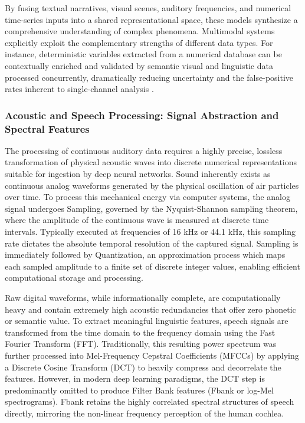 By fusing textual narratives, visual scenes, auditory frequencies, and numerical time-series inputs into a shared representational space, these models synthesize a comprehensive understanding of complex phenomena. Multimodal systems explicitly exploit the complementary strengths of different data types. For instance, deterministic variables extracted from a numerical database can be contextually enriched and validated by semantic visual and linguistic data processed concurrently, dramatically reducing uncertainty and the false-positive rates inherent to single-channel analysis \parencite{gumber2025multimodal}.

\subsubsection{Acoustic and Speech Processing: Signal Abstraction and Spectral Features}
The processing of continuous auditory data requires a highly precise, lossless transformation of physical acoustic waves into discrete numerical representations suitable for ingestion by deep neural networks. Sound inherently exists as continuous analog waveforms generated by the physical oscillation of air particles over time. To process this mechanical energy via computer systems, the analog signal undergoes Sampling, governed by the Nyquist-Shannon sampling theorem, where the amplitude of the continuous wave is measured at discrete time intervals. Typically executed at frequencies of 16 kHz or 44.1 kHz, this sampling rate dictates the absolute temporal resolution of the captured signal. Sampling is immediately followed by Quantization, an approximation process which maps each sampled amplitude to a finite set of discrete integer values, enabling efficient computational storage and processing.

Raw digital waveforms, while informationally complete, are computationally heavy and contain extremely high acoustic redundancies that offer zero phonetic or semantic value. To extract meaningful linguistic features, speech signals are transformed from the time domain to the frequency domain using the Fast Fourier Transform (FFT). Traditionally, this resulting power spectrum was further processed into Mel-Frequency Cepstral Coefficients (MFCCs) by applying a Discrete Cosine Transform (DCT) to heavily compress and decorrelate the features. However, in modern deep learning paradigms, the DCT step is predominantly omitted to produce Filter Bank features (Fbank or log-Mel spectrograms). Fbank retains the highly correlated spectral structures of speech directly, mirroring the non-linear frequency perception of the human cochlea.

